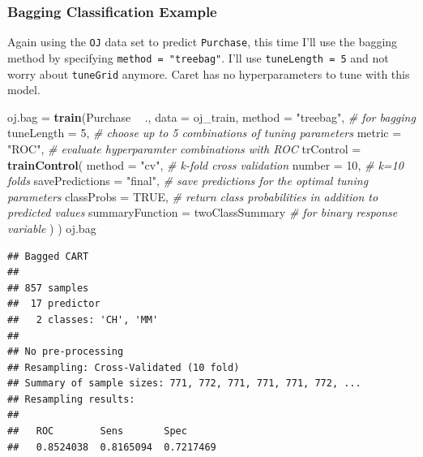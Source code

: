 \documentclass[]{book}
\newenvironment{Shaded}{\begin{snugshade}}{\end{snugshade}}
\newcommand{\CommentTok}[1]{\textcolor[rgb]{0.56,0.35,0.01}{\textit{#1}}}
\newcommand{\DataTypeTok}[1]{\textcolor[rgb]{0.13,0.29,0.53}{#1}}
\newcommand{\DecValTok}[1]{\textcolor[rgb]{0.00,0.00,0.81}{#1}}
\newcommand{\KeywordTok}[1]{\textcolor[rgb]{0.13,0.29,0.53}{\textbf{#1}}}
\newcommand{\NormalTok}[1]{#1}
\newcommand{\OperatorTok}[1]{\textcolor[rgb]{0.81,0.36,0.00}{\textbf{#1}}}
\newcommand{\OtherTok}[1]{\textcolor[rgb]{0.56,0.35,0.01}{#1}}
\newcommand{\StringTok}[1]{\textcolor[rgb]{0.31,0.60,0.02}{#1}}
\begin{document}
\hypertarget{bagging-classification-example}{%
\subsubsection{Bagging Classification Example}\label{bagging-classification-example}}

Again using the \texttt{OJ} data set to predict \texttt{Purchase}, this time I'll use the bagging method by specifying \texttt{method\ =\ "treebag"}. I'll use \texttt{tuneLength\ =\ 5} and not worry about \texttt{tuneGrid} anymore. Caret has no hyperparameters to tune with this model.

\begin{Shaded}
\begin{Highlighting}[]
\NormalTok{oj.bag =}\StringTok{ }\KeywordTok{train}\NormalTok{(Purchase }\OperatorTok{~}\StringTok{ }\NormalTok{., }
               \DataTypeTok{data =}\NormalTok{ oj_train, }
               \DataTypeTok{method =} \StringTok{"treebag"}\NormalTok{,  }\CommentTok{# for bagging}
               \DataTypeTok{tuneLength =} \DecValTok{5}\NormalTok{,  }\CommentTok{# choose up to 5 combinations of tuning parameters}
               \DataTypeTok{metric =} \StringTok{"ROC"}\NormalTok{,  }\CommentTok{# evaluate hyperparamter combinations with ROC}
               \DataTypeTok{trControl =} \KeywordTok{trainControl}\NormalTok{(}
                 \DataTypeTok{method =} \StringTok{"cv"}\NormalTok{,  }\CommentTok{# k-fold cross validation}
                 \DataTypeTok{number =} \DecValTok{10}\NormalTok{,  }\CommentTok{# k=10 folds}
                 \DataTypeTok{savePredictions =} \StringTok{"final"}\NormalTok{,       }\CommentTok{# save predictions for the optimal tuning parameters}
                      \DataTypeTok{classProbs =} \OtherTok{TRUE}\NormalTok{,  }\CommentTok{# return class probabilities in addition to predicted values}
                      \DataTypeTok{summaryFunction =}\NormalTok{ twoClassSummary  }\CommentTok{# for binary response variable}
\NormalTok{                      )}
\NormalTok{                    )}
\NormalTok{oj.bag}
\end{Highlighting}
\end{Shaded}

\begin{verbatim}
## Bagged CART 
## 
## 857 samples
##  17 predictor
##   2 classes: 'CH', 'MM' 
## 
## No pre-processing
## Resampling: Cross-Validated (10 fold) 
## Summary of sample sizes: 771, 772, 771, 771, 771, 772, ... 
## Resampling results:
## 
##   ROC        Sens       Spec     
##   0.8524038  0.8165094  0.7217469
\end{verbatim}
\end{document}
